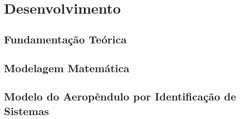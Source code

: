 \chapter{Desenvolvimento}

\lipsum[1] %

\section{ Fundamentação Teórica}


\section{Modelagem Matemática}


\section{Modelo do Aeropêndulo por Identificação de Sistemas}
